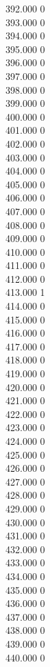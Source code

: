 { 392.000	0 \\
 393.000	0 \\
 394.000	0 \\
 395.000	0 \\
 396.000	0 \\
 397.000	0 \\
 398.000	0 \\
 399.000	0 \\
 400.000	0 \\
 401.000	0 \\
 402.000	0 \\
 403.000	0 \\
 404.000	0 \\
 405.000	0 \\
 406.000	0 \\
 407.000	0 \\
 408.000	0 \\
 409.000	0 \\
 410.000	0 \\
 411.000	0 \\
 412.000	0 \\
 413.000	1 \\
 414.000	0 \\
 415.000	0 \\
 416.000	0 \\
 417.000	0 \\
 418.000	0 \\
 419.000	0 \\
 420.000	0 \\
 421.000	0 \\
 422.000	0 \\
 423.000	0 \\
 424.000	0 \\
 425.000	0 \\
 426.000	0 \\
 427.000	0 \\
 428.000	0 \\
 429.000	0 \\
 430.000	0 \\
 431.000	0 \\
 432.000	0 \\
 433.000	0 \\
 434.000	0 \\
 435.000	0 \\
 436.000	0 \\
 437.000	0 \\
 438.000	0 \\
 439.000	0 \\
 440.000	0 \\
}
